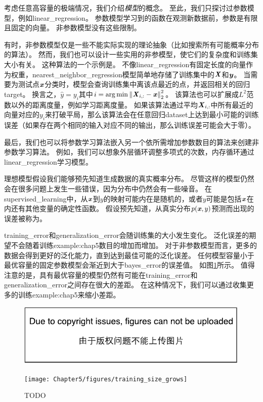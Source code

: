 
考虑任意高容量的极端情况，我们介绍\emph{模型}的概念。
至此，我们只探讨过参数模型，例如\gls{linear_regression}。
参数模型学习到的函数在观测新数据前，参数是有限且固定的向量。
非参数模型没有这些限制。

有时，非参数模型仅是一些不能实际实现的理论抽象（比如搜索所有可能概率分布的算法）。
然而，我们也可以设计一些实用的非参模型，使它们的复杂度和训练集大小有关。
这种算法的一个示例是。
不像\gls{linear_regression}有固定长度的向量作为权重，\gls{nearest_neighbor_regression}模型简单地存储了训练集中的$\boldsymbol{\mathit{X}}$和$\boldsymbol{\mathit{y}}$。
当需要为测试点$\boldsymbol{\mathit{x}}$分类时，模型会查询训练集中离该点最近的点，并返回相关的回归\gls{target}。
换言之，$\hat{y}=y_i$其中$i=\arg\min\left\lVert\boldsymbol{\mathit{X}}_{i,:}-\boldsymbol{\mathit{x}}\right\rVert_2^2$。
该算法也可以扩展成$L^2$范数以外的距离度量，例如学习距离度量\citep{RoweisNCA2005}。
如果该算法通过平均$\boldsymbol{\mathit{X}}_{i,:}$中所有最近的向量对应的$y_i$来打破平局，那么该算法会在任意回归\gls{dataset}上达到最小可能的训练误差（如果存在两个相同的输入对应不同的输出，那么训练误差可能会大于零）。

最后，我们也可以将参数学习算法嵌入另一个依所需增加参数数目的算法来创建非参数学习算法。
例如，我们可以想象外层循环调整多项式的次数，内存循环通过\gls{linear_regression}学习模型。


理想模型假设我们能够预先知道生成数据的真实概率分布。
尽管这样的模型仍然会在很多问题上发生一些错误，因为分布中仍然会有一些噪音。
在\gls{supervised_learning}中，从$\boldsymbol{\mathit{x}}$到$y$的映射可能内在是随机的，或者$y$可能是包括$\boldsymbol{\mathit{x}}$在内还有其他变量的确定性函数。
假设预先知道，从真实分布$p(\boldsymbol{\mathit{x}},y)$预测而出现的误差被称为。

\gls{training_error}和\gls{generalization_error}会随训练集的大小发生变化。
泛化误差的期望不会随着训练\gls{example:chap5}数目的增加而增加。
对于非参数模型而言，更多的数据会得到更好的泛化能力，直到达到最佳可能的泛化误差。
任何模型容量小于最优容量的固定参数模型会渐近到大于\gls{bayes_error}的误差值。
如图\ref{fig:chap5_training_size_grows}所示。
值得注意的是，具有最优容量的模型仍然有可能在\gls{training_error}和\gls{generalization_error}之间存在很大的差距。
在这种情况下，我们可以通过收集更多的训练\gls{example:chap5}来缩小差距。

\begin{figure}[!htb]
\ifOpenSource
\centerline{\includegraphics{figure.pdf}}
\else
\centerline{\texttt{[image: Chapter5/figures/training\_size\_grows]}}
\fi
\caption{TODO}
\label{fig:chap5_training_size_grows}
\end{figure}

